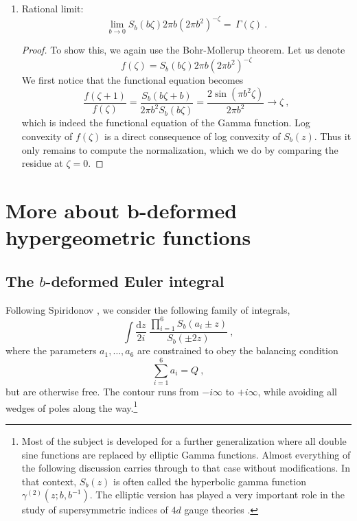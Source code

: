 \documentclass[12pt,a4paper]{article}
\newcommand{\be}{\begin{equation}}
\newcommand{\ee}{\end{equation}}
\renewcommand\d{\text{d}}
\begin{document}
\begin{enumerate}
    \be  
        0<z<Q\,:\quad \frac{\mathrm{d}^2}{\mathrm{d}z^2} \log S_b(z)>0
    \ee
    \begin{proof}
        This is trivial to show from the integral representation. For $0<z<Q$ the integral converges absolutely and we can compute
        \be  
            \frac{\mathrm{d}^2}{\mathrm{d}z^2} \log S_b(z)=\int_0^\infty \mathrm{d}t\ \frac{t \sinh((\frac{Q}{2}-z)t)}{2 \sinh(\frac{bt}{2})\sinh(\frac{t}{2b})}>0\ ,
        \ee
        since the integrand is everywhere non-negative.
    \end{proof}
    \item Rational limit:
    \be  
        \lim_{b \to 0} S_b(b \zeta)2\pi b(2\pi b^2)^{-\zeta}=\, \Gamma(\zeta)\ . \label{eq:S_b rational limit}
    \ee
    \begin{proof}
        To show this, we again use the Bohr-Mollerup theorem. Let us denote
        \be  
        f(\zeta)=S_b(b\zeta) 2\pi b(2\pi b^2)^{-\zeta}
        \ee
        We first notice that the functional equation becomes
        \be  
            \frac{f(\zeta+1)}{f(\zeta)}=\frac{S_b(b\zeta+b)}{2\pi b^2S_b(b \zeta)}=\frac{2\sin(\pi b^2 \zeta)}{2\pi b^2} \longrightarrow \zeta\ ,   
        \ee
        which is indeed the functional equation of the Gamma function. Log convexity of $f(\zeta)$ is a direct consequence of log convexity of $S_b(z)$. Thus it only remains to compute the normalization, which we do by comparing the residue at $\zeta=0$. 
    \end{proof}
  
\end{enumerate}

\section{More about \texorpdfstring{$\boldsymbol{b}$}{b}-deformed hypergeometric functions} \label{app:hypergeometric functions}
\subsection{The \texorpdfstring{$b$}{b}-deformed Euler integral}
Following Spiridonov \cite{SpiridonovElliptic}, we consider the following family of integrals,
\be 
\int \frac{\d z}{2i}\  \frac{\prod_{i=1}^6 S_b(a_i \pm z)}{S_b(\pm 2z)}\ , \label{eq:b-deformed Euler integral}
\ee
where the parameters $a_1,\dots,a_6$ are constrained to obey the balancing condition
\be 
\sum_{i=1}^6 a_i=Q\ ,
\ee
but are otherwise free. The contour runs from $-i\infty$ to $+i \infty$, while avoiding all wedges of poles along the way.\footnote{Most of the subject is developed for a further generalization where all double sine functions are replaced by elliptic Gamma functions. Almost everything of the following discussion carries through to that case without modifications. In that context, $S_b(z)$ is often called the hyperbolic gamma function $\gamma^{(2)}(z;b,b^{-1})$. The elliptic version has played a very important role in the study of supersymmetric indices of $4d$ gauge theories \cite{Kinney:2005ej, Dolan:2008qi}.}
\end{document}
